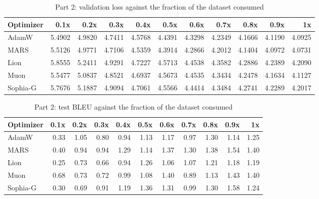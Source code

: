 \begin{table}[htbp]
  \centering
  \caption{Part 2: validation loss against the fraction of the dataset consumed}
  \label{tab:part2_curve}
  \begin{tabular}{lrrrrrrrrrr}
    \toprule
    Optimizer & 0.1x & 0.2x & 0.3x & 0.4x & 0.5x & 0.6x & 0.7x & 0.8x & 0.9x & 1x \\
    \midrule
    AdamW & 5.4902 & 4.9820 & 4.7411 & 4.5768 & 4.4391 & 4.3298 & 4.2349 & 4.1666 & 4.1190 & 4.0925 \\
    MARS & 5.5126 & 4.9771 & 4.7106 & 4.5359 & 4.3914 & 4.2866 & 4.2012 & 4.1404 & 4.0972 & 4.0731 \\
    Lion & 5.8555 & 5.2411 & 4.9291 & 4.7227 & 4.5713 & 4.4538 & 4.3582 & 4.2886 & 4.2389 & 4.2090 \\
    Muon & 5.5477 & 5.0837 & 4.8521 & 4.6937 & 4.5673 & 4.4535 & 4.3434 & 4.2478 & 4.1634 & 4.1127 \\
    Sophia-G & 5.7676 & 5.1887 & 4.9094 & 4.7061 & 4.5566 & 4.4414 & 4.3484 & 4.2741 & 4.2289 & 4.2017 \\
    \bottomrule
  \end{tabular}
\end{table}

\begin{table}[htbp]
  \centering
  \caption{Part 2: test BLEU against the fraction of the dataset consumed}
  \label{tab:part2_bleu}
  \begin{tabular}{lrrrrrrrrrr}
    \toprule
    Optimizer & 0.1x & 0.2x & 0.3x & 0.4x & 0.5x & 0.6x & 0.7x & 0.8x & 0.9x & 1x \\
    \midrule
    AdamW & 0.33 & 1.05 & 0.80 & 0.94 & 1.13 & 1.17 & 0.97 & 1.30 & 1.14 & 1.25 \\
    MARS & 0.40 & 0.94 & 0.94 & 1.29 & 1.14 & 1.37 & 1.30 & 1.38 & 1.54 & 1.40 \\
    Lion & 0.25 & 0.73 & 0.66 & 0.94 & 1.26 & 1.06 & 1.07 & 1.21 & 1.18 & 1.19 \\
    Muon & 0.68 & 0.73 & 0.72 & 0.99 & 1.08 & 1.40 & 0.89 & 1.13 & 1.43 & 1.40 \\
    Sophia-G & 0.30 & 0.69 & 0.91 & 1.19 & 1.36 & 1.31 & 0.99 & 1.30 & 1.58 & 1.24 \\
    \bottomrule
  \end{tabular}
\end{table}

